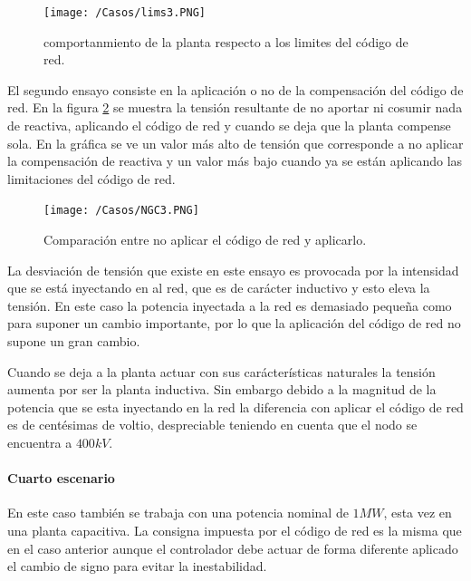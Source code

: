 \documentclass{book}
\begin{document}
\begin{figure}[h!]
\centering
\texttt{[image: /Casos/lims3.PNG]}
\caption{comportanmiento de la planta respecto a los limites del c\'odigo de red. }
\label{lims3}
\end{figure} \par

El segundo ensayo consiste en la aplicaci\'on o no de la compensaci\'on del c\'odigo de red. En la figura \ref{NGC3} se muestra la tensi\'on resultante de no aportar ni cosumir nada de reactiva, aplicando el c\'odigo de red y cuando se deja que la planta compense sola. En la gr\'afica se ve un valor m\'as alto de tensi\'on que corresponde a no aplicar la compensaci\'on de reactiva y un valor m\'as bajo cuando ya se est\'an aplicando las limitaciones del c\'odigo de red. \par

\begin{figure}[h!]
\centering
\texttt{[image: /Casos/NGC3.PNG]}
\caption{Comparaci\'on entre no aplicar el c\'odigo de red y aplicarlo. }
\label{NGC3}
\end{figure} \par

La desviaci\'on de tensi\'on que existe en este ensayo es provocada por la intensidad que se est\'a inyectando en al red, que es de car\'acter inductivo y esto eleva la tensi\'on. En este caso la potencia inyectada a la red es demasiado pequeña como para suponer un cambio importante, por lo que la aplicaci\'on del c\'odigo de red no supone un gran cambio.  \par

Cuando se deja a la planta actuar con sus car\'acter\'isticas naturales la tensi\'on aumenta por ser la planta inductiva. Sin embargo debido a la magnitud de la potencia que se esta inyectando en la red la diferencia con aplicar el c\'odigo de red es de cent\'esimas de voltio, despreciable teniendo en cuenta que el nodo se encuentra a $400kV$. \par



	\paragraph{Cuarto escenario}

En este caso tambi\'en se trabaja con una potencia nominal de $1MW$, esta vez en una planta capacitiva. La consigna impuesta por el c\'odigo de red es la misma que en el caso anterior aunque el controlador debe actuar de forma diferente aplicado el cambio de signo para evitar la inestabilidad. 
\end{document}
